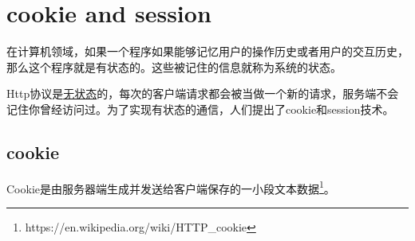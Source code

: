 \chapter{cookie and session}
在计算机领域，如果一个程序如果能够记忆用户的操作历史或者用户的交互历史，那么这个程序就是有状态的。这些被记住的信息就称为系统的状态。

Http协议是\underline{无状态}的，每次的客户端请求都会被当做一个新的请求，服务端不会记住你曾经访问过。为了实现有状态的通信，人们提出了cookie和session技术。
\section{cookie}
Cookie是由服务器端生成并发送给客户端保存的一小段文本数据\footnote{https://en.wikipedia.org/wiki/HTTP_cookie}。